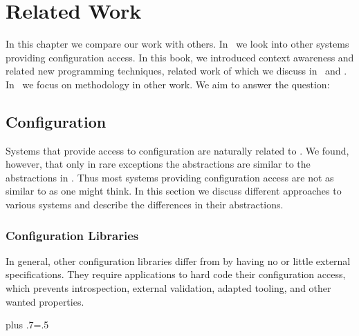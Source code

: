 \chapter{Related Work}
\label{chapter:related}

\chapterhung

In this chapter we compare our work with others.
In~ we look into other systems providing configuration access.
In this book, we introduced context awareness and related new programming techniques, related work of which we discuss in~ and .
In~ we focus on methodology in other work.
We aim to answer the question:
\rqRelated*



\section{Configuration}
\label{sec:related-configuration}

Systems that provide access to configuration are naturally related to \elektra{}.
We found, however, that only in rare exceptions the abstractions are similar to the abstractions in \elektra{}.
Thus most systems providing configuration access are not as similar to \elektra{} as one might think.
In this section we discuss different approaches to various systems and describe the differences in their abstractions.

\subsection{Configuration Libraries}

In general, other configuration libraries differ from \elektra{} by having no or little external specifications.
They require applications to hard code their configuration access, which prevents introspection, external validation, adapted tooling, and other wanted properties.%
{\parfillskip=0pt plus .7\textwidth \emergencystretch=.5\textwidth \par}

